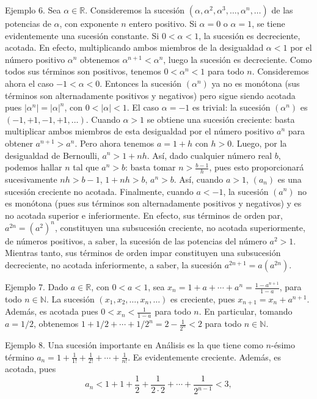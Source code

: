 \documentclass[12pt,oneside]{book}
\begin{document}
Ejemplo 6. Sea \(\alpha \in \mathbb{R}\). Consideremos la sucesión \((\alpha, \alpha^2, \alpha^3, \dots, \alpha^n, \dots)\) de las potencias de \(\alpha\), con exponente \(n\) entero positivo. Si \(\alpha = 0\) o \(\alpha = 1\), se tiene evidentemente una sucesión constante. Si \(0 < \alpha < 1\), la sucesión es decreciente, acotada. En efecto, multiplicando ambos miembros de la desigualdad \(\alpha < 1\) por el número positivo \(\alpha^n\) obtenemos \(\alpha^{n+1} < \alpha^n\), luego la sucesión es decreciente. Como todos sus términos son positivos, tenemos \(0 < \alpha^n < 1\) para todo \(n\). Consideremos ahora el caso \(-1 < \alpha < 0\). Entonces la sucesión \((\alpha^n)\) ya no es monótona (sus términos son alternadamente positivos y negativos) pero sigue siendo acotada pues \(|\alpha^n| = |\alpha|^n\), con \(0 < |\alpha| < 1\). El caso \(\alpha = -1\) es trivial: la sucesión \((\alpha^n)\) es \((-1, +1, -1, +1, \dots)\). Cuando \(\alpha > 1\) se obtiene una sucesión creciente: basta multiplicar ambos miembros de esta desigualdad por el número positivo \(a^n\) para obtener \(a^{n+1} > a^n\). Pero ahora tenemos \(a = 1 + h\) con \(h > 0\). Luego, por la desigualdad de Bernoulli, \(a^n > 1 + nh\). Así, dado cualquier número real \(b\), podemos hallar \(n\) tal que \(a^n > b\): basta tomar \(n > \frac{b-1}{h}\), pues esto proporcionará sucesivamente \(nh > b - 1\), \(1 + nh > b\), \(a^n > b\). Así, cuando \(a > 1\), \((a_n)\) es una sucesión creciente no acotada. Finalmente, cuando \(a < -1\), la sucesión \((a^n)\) no es monótona (pues sus términos son alternadamente positivos y negativos) y es no acotada superior e inferiormente. En efecto, sus términos de orden par, \(a^{2n} = (a^2)^n\), constituyen una subsucesión creciente, no acotada superiormente, de números positivos, a saber, la sucesión de las potencias del número \(a^2 > 1\). Mientras tanto, sus términos de orden impar constituyen una subsucesión decreciente, no acotada inferiormente, a saber, la sucesión \(a^{2n+1} = a(a^{2n})\).

Ejemplo 7. Dado \(a \in \mathbb{R}\), con \(0 < a < 1\), sea \(x_n = 1 + a + \cdots + a^n = \frac{1 - a^{n+1}}{1 - a}\), para todo \(n \in \mathbb{N}\). La sucesión \((x_1, x_2, \ldots, x_n, \ldots)\) es creciente, pues \(x_{n+1} = x_n + a^{n+1}\). Además, es acotada pues \(0 < x_n < \frac{1}{1 - a}\) para todo \(n\). En particular, tomando \(a = 1/2\), obtenemos \(1 + 1/2 + \cdots + 1/2^n = 2 - \frac{1}{2^n} < 2\) para todo \(n \in \mathbb{N}\).

Ejemplo 8. Una sucesión importante en Análisis es la que tiene como \(n\)-ésimo término \(a_n = 1 + \frac{1}{1!} + \frac{1}{2!} + \cdots + \frac{1}{n!}\). Es evidentemente creciente. Además, es acotada, pues
\[a_n < 1 + 1 + \frac{1}{2} + \frac{1}{2 \cdot 2} + \cdots + \frac{1}{2^{n-1}} < 3,\]
\end{document}
